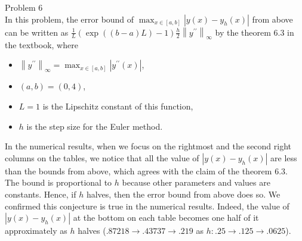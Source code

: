 \documentclass[dvipdfmx]{article}
\newcommand{\norm}[1]{\left\lVert#1\right\rVert}
\begin{document}
Problem 6\\
In this problem, the error bound of $\max_{x \in [a,b]}\left|y(x)-y_h(x)\right|$
from above can be written as 
$\frac{1}{L}\left(\exp\left((b-a)L\right) - 1\right) \frac{h}{2} \norm{y^{\prime\prime}}_{\infty}$ 
by the theorem $6.3$ in the textbook, 
where 
\begin{itemize}
  \item $\norm{y^{\prime\prime}}_{\infty} = \max_{x \in [a,b]}\left|y^{\prime\prime}(x)\right|$,
  \item $(a,b) = (0, 4)$,
  \item $L = 1$ is the Lipschitz constant of this function, 
  \item $h$ is the step size for the Euler method.
\end{itemize}

In the numerical results, when we focus on the rightmost and the second right columns on the tables, we notice that all the value of $\left|y(x)-y_h(x)\right|$ are less than the bounds from above, which agrees with the claim of the theorem $6.3$.\\
The bound is proportional to $h$ because other parameters and values are constants. Hence, if $h$ halves, then the error bound from above does so. We confirmed this conjecture is true in the numerical results. Indeed, the value of $\left|y(x)-y_h(x)\right|$ at the bottom on each table becomes one half of it approximately as $h$ halves ($.87218 \to .43737 \to .219$ as $h: .25 \to .125 \to .0625$).\\
\end{document}
